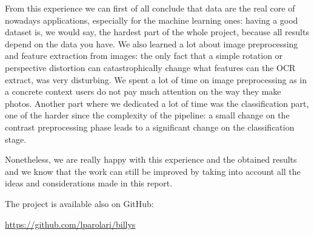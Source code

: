 \documentclass[10pt,twocolumn,letterpaper]{article}
\begin{document}
From this experience we can first of all conclude that data are the
real core of nowadays applications, especially for the machine learning
ones: having a good dataset is, we would say, the hardest part of the
whole project, because all results depend on the data you have. We
also learned a lot about image preprocessing and feature extraction
from images: the only fact that a simple rotation or perspective
distortion can catastrophically change what features can the OCR
extract, was very disturbing. We spent a lot of time on image
preprocessing as in a concrete context users do not pay much attention
on the way they make photos. Another part where we dedicated a lot of
time was the classification part, one of the harder since the complexity of the pipeline: a small change on the
contrast preprocessing phase leads to a significant change on the
classification stage.

Nonetheless, we are really happy with this experience and the obtained
results and we know that the work can still be improved by taking into
account all the ideas and considerations made in this report.

The project is available also on GitHub:
\begin{center}
  \href{https://github.com/lparolari/billys}{https://github.com/lparolari/billys}
\end{center}

{\small


}
\end{document}
